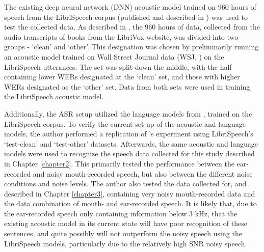 The existing deep neural network (DNN) acoustic model trained on 960 hours of speech from the LibriSpeech corpus (published and described in \cite{panayotov:15}) was used to test the collected data.  As described in \cite{panayotov:15}, the 960 hours of data, collected from the audio transcripts of books from the LibriVox website, was divided into two groups - `clean' and `other'.  This designation was chosen by preliminarily running an acoustic model trained on Wall Street Journal data (WSJ, \cite{paul:92}) on the LibriSpeech utterances. The set was split down the middle, with the half containing lower WERs designated at the `clean' set, and those with higher WERs designated as the `other' set.  Data from both sets were used in training the LibriSpeech acoustic model.  \DIFaddbegin {}\DIFaddend 

Additionally, the ASR setup utilized the language models from \cite{panayotov:15}, trained on the LibriSpeech corpus.  To verify the current set-up of the acoustic and language models, the author performed a replication of \cite{panayotov:15}'s experiment using LibriSpeech's `test-clean' and `test-other' datasets.  Afterwards, the same acoustic and language models were used to recognize the speech data collected for this study described in Chapter \ref{chapter2}. This primarily tested the performance between the ear-recorded and noisy mouth-recorded speech, but also between the different noise conditions and noise levels.  The author also tested the data collected for, and described in Chapter \ref{chapter3}, containing very noisy mouth-recorded data and the data combination of mouth- and ear-recorded speech.
It is likely that, due to the ear-recorded speech only containing information below 3 kHz, that the existing acoustic model in its current state will have poor recognition of these sentences, and quite possibly will not outperform the noisy speech using the LibriSpeech models, particularly due to the relatively high SNR noisy speech.

